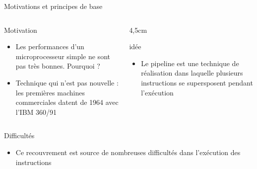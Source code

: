%
\begin{Frame}{Motivations et principes de base}
  \begin{columns}[t]
    \begin{column}{7cm} %
      \begin{block}{Motivation}
        \begin{itemize}
        \item Les performances d'un microprocesseur simple ne sont pas
          très bonnes. Pourquoi ?
        \item Technique qui n'est pas nouvelle : les premières
          machines commerciales datent de 1964 avec l'IBM 360/91
        \end{itemize}
      \end{block} 
    \end{column}
    
    \begin{column}{4,5cm} %
      \begin{block}{idée}
        \begin{itemize}
        \item Le pipeline est une technique de réalisation dans
          laquelle plusieurs instructions se supersposent pendant
          l'exécution
        \end{itemize}
      \end{block}   
    \end{column}
  \end{columns}  

  \begin{block}{Difficultés}
       \begin{center}
 	\begin{itemize}
    \item Ce recouvrement est source de nombreuses difficultés dans
      l'exécution des instructions
        \end{itemize}
       \end{center}
      \end{block}   

\end{Frame}


